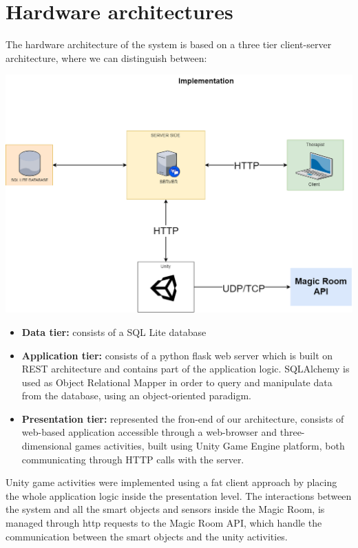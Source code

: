 	\section{Hardware architectures}
	The hardware architecture of the system is based on a three tier client-server architecture, where we can distinguish between:
	\begin{center}
		\includegraphics[width=\textwidth]{images/diagram1.png}
	\end{center}
	\begin{itemize}
		\item \textbf{Data tier:} consists of a SQL Lite database
		\item \textbf{Application tier:} consists of a python flask web server which is built on REST architecture and contains part of the application logic. SQLAlchemy is used as Object Relational Mapper in order to query and manipulate data from the database, using an object-oriented paradigm.
		\item \textbf{Presentation tier:} represented the fron-end of our architecture, consists of web-based application accessible through a web-browser and three-dimensional games activities, built using Unity Game Engine platform, both communicating through HTTP calls with the server.
	\end{itemize}
	\noindent
	Unity game activities were implemented using a fat client approach by placing the whole application logic inside the presentation level. \newline
	The interactions between the system and all the smart objects and sensors inside the Magic Room, is managed through http requests to the Magic Room API, which handle the communication between the smart objects and the unity activities.
	
